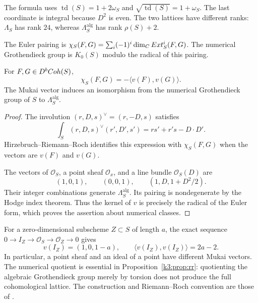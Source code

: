 The formula uses $\operatorname{td}(S)=1+2\omega_S$ and
$\sqrt{\operatorname{td}(S)}=1+\omega_S$.  The last coordinate is
integral because $D^2$ is even.  The two lattices have different ranks:
$\Lambda_S$ has rank $24$, whereas $\Lambda_S^{\mathrm{alg}}$ has rank
$\rho(S)+2$.

The Euler pairing is
$\chi_S(F,G)=\sum_i(-1)^i\dim_{C}Ext^i_S(F,G)$.
The numerical Grothendieck group is $K_0(S)$ modulo the radical
of this pairing.

\begin{proposition}
\label{k3:prop:rr}
For $F,G\in D^bCoh(S)$,
\[
\chi_S(F,G)=-\langle v(F),v(G)\rangle.
\]
The Mukai vector induces an isomorphism from the numerical
Grothendieck group of $S$ to $\Lambda_S^{\mathrm{alg}}$.
\end{proposition}

\begin{proof}
The involution $(r,D,s)^\vee=(r,-D,s)$ satisfies
\[
\int_S(r,D,s)^\vee(r',D',s')=rs'+r's-D\cdot D'.
\]
Hirzebruch--Riemann--Roch identifies this expression with
$\chi_S(F,G)$ when the vectors are $v(F)$ and $v(G)$.

The vectors of $\mathcal O_S$, a point sheaf $\mathcal O_x$, and a
line bundle $\mathcal O_S(D)$ are
\[
(1,0,1),\qquad (0,0,1),\qquad (1,D,1+D^2/2).
\]
Their integer combinations generate $\Lambda_S^{\mathrm{alg}}$.
Its pairing is nondegenerate by the Hodge index theorem.  Thus the
kernel of $v$ is precisely the radical of the Euler form, which
proves the assertion about numerical classes.
\end{proof}

For a zero-dimensional subscheme $Z\subset S$ of length $a$, the exact
sequence $0\to I_Z\to\mathcal O_S\to\mathcal O_Z\to0$ gives
\[
v(I_Z)=(1,0,1-a),\qquad
\langle v(I_Z),v(I_Z)\rangle=2a-2.
\]
In particular, a point sheaf and an ideal of a point have different
Mukai vectors.  The numerical quotient is essential in
Proposition~\ref{k3:prop:rr}: quotienting the algebraic Grothendieck
group merely by torsion does not produce the full cohomological
lattice.  The construction and Riemann--Roch convention are those of
\cite{Mukai1984,Mukai1987,HuybrechtsK3}.

